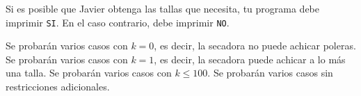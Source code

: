 \documentclass{oci}
\begin{document}
\begin{outputDescription}
Si es posible que Javier obtenga las tallas que necesita, tu programa debe imprimir \texttt{SI}. En el caso contrario, debe imprimir \texttt{NO}.
\end{outputDescription}

\begin{scoreDescription}
  Se probarán varios casos con $k=0$, es decir, la secadora no puede achicar poleras.
  Se probarán varios casos con $k=1$, es decir, la secadora puede achicar a lo más una talla.
  Se probarán varios casos con $k \leq 100$.
  Se probarán varios casos sin restricciones adicionales.
\end{scoreDescription}

\begin{sampleDescription}
\end{sampleDescription}
\end{document}
